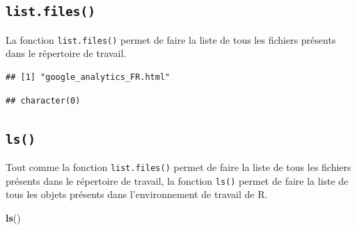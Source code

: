 \documentclass[]{book}
\newenvironment{Shaded}{\begin{snugshade}}{\end{snugshade}}
\newcommand{\CommentTok}[1]{\textcolor[rgb]{0.56,0.35,0.01}{\textit{#1}}}
\newcommand{\DataTypeTok}[1]{\textcolor[rgb]{0.13,0.29,0.53}{#1}}
\newcommand{\KeywordTok}[1]{\textcolor[rgb]{0.13,0.29,0.53}{\textbf{#1}}}
\newcommand{\NormalTok}[1]{#1}
\newcommand{\StringTok}[1]{\textcolor[rgb]{0.31,0.60,0.02}{#1}}
\begin{document}
\hypertarget{l015listfiles}{%
\subsection{\texorpdfstring{\texttt{list.files()}}{list.files()}}\label{l015listfiles}}

La fonction \texttt{list.files()} permet de faire la liste de tous les fichiers présents dans le répertoire de travail.

\begin{Shaded}
\end{Shaded}

\begin{verbatim}
## [1] "google_analytics_FR.html"
\end{verbatim}

\begin{Shaded}
\end{Shaded}

\begin{verbatim}
## character(0)
\end{verbatim}

\hypertarget{l015ls}{%
\subsection{\texorpdfstring{\texttt{ls()}}{ls()}}\label{l015ls}}

Tout comme la fonction \texttt{list.files()} permet de faire la liste de tous les fichiers présents dans le répertoire de travail, la fonction \texttt{ls()} permet de faire la liste de tous les objets présents dans l'environnement de travail de R.

\begin{Shaded}
\begin{Highlighting}[]
\KeywordTok{ls}\NormalTok{()}
\end{Highlighting}
\end{Shaded}
\end{document}
